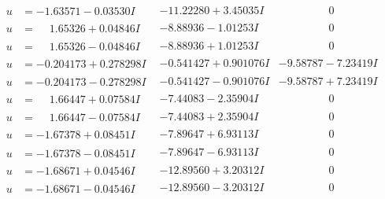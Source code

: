 \documentclass[1p]{elsarticle_modified}
\theoremstyle{definition}
\begin{document}
$$\begin{array}{c|c|c}
\begin{aligned}
u &= -1.63571 - 0.03530 I\end{aligned}
 & -11.22280 + 3.45035 I & \phantom{-0.000000 } 0 \\ \hline\begin{aligned}
u &= \phantom{-}1.65326 + 0.04846 I\end{aligned}
 & -8.88936 - 1.01253 I & \phantom{-0.000000 } 0 \\ \hline\begin{aligned}
u &= \phantom{-}1.65326 - 0.04846 I\end{aligned}
 & -8.88936 + 1.01253 I & \phantom{-0.000000 } 0 \\ \hline\begin{aligned}
u &= -0.204173 + 0.278298 I\end{aligned}
 & -0.541427 + 0.901076 I & -9.58787 - 7.23419 I \\ \hline\begin{aligned}
u &= -0.204173 - 0.278298 I\end{aligned}
 & -0.541427 - 0.901076 I & -9.58787 + 7.23419 I \\ \hline\begin{aligned}
u &= \phantom{-}1.66447 + 0.07584 I\end{aligned}
 & -7.44083 - 2.35904 I & \phantom{-0.000000 } 0 \\ \hline\begin{aligned}
u &= \phantom{-}1.66447 - 0.07584 I\end{aligned}
 & -7.44083 + 2.35904 I & \phantom{-0.000000 } 0 \\ \hline\begin{aligned}
u &= -1.67378 + 0.08451 I\end{aligned}
 & -7.89647 + 6.93113 I & \phantom{-0.000000 } 0 \\ \hline\begin{aligned}
u &= -1.67378 - 0.08451 I\end{aligned}
 & -7.89647 - 6.93113 I & \phantom{-0.000000 } 0 \\ \hline\begin{aligned}
u &= -1.68671 + 0.04546 I\end{aligned}
 & -12.89560 + 3.20312 I & \phantom{-0.000000 } 0 \\ \hline\begin{aligned}
u &= -1.68671 - 0.04546 I\end{aligned}
 & -12.89560 - 3.20312 I & \phantom{-0.000000 } 0 \\ \hline\begin{aligned}

\end{aligned}
\end{array}$$
\end{document}
